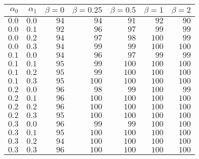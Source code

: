 \begin{tabular}{rr|rrrrr}
\hline\hline
 $\alpha_0$ & $\alpha_1$ & $\beta=0$ & $\beta=0.25$ & $\beta=0.5$ & $\beta=1$ & $\beta=2$ \\ 
 \hline
$0.0$ & $0.0$ & $94$ & $ 94$ & $ 91$ & $ 92$ & $ 90$\\ 
$0.0$ & $0.1$ & $92$ & $ 96$ & $ 97$ & $ 99$ & $ 99$\\ 
$0.0$ & $0.2$ & $94$ & $ 97$ & $ 98$ & $100$ & $ 99$\\ 
$0.0$ & $0.3$ & $94$ & $ 99$ & $ 99$ & $100$ & $100$\\ 
$0.1$ & $0.0$ & $94$ & $ 96$ & $ 97$ & $ 99$ & $ 99$\\ 
$0.1$ & $0.1$ & $95$ & $ 99$ & $100$ & $100$ & $100$\\ 
$0.1$ & $0.2$ & $95$ & $ 99$ & $100$ & $100$ & $100$\\ 
$0.1$ & $0.3$ & $95$ & $100$ & $100$ & $100$ & $100$\\ 
$0.2$ & $0.0$ & $96$ & $ 98$ & $ 99$ & $100$ & $ 99$\\ 
$0.2$ & $0.1$ & $96$ & $100$ & $100$ & $100$ & $100$\\ 
$0.2$ & $0.2$ & $96$ & $100$ & $100$ & $100$ & $100$\\ 
$0.2$ & $0.3$ & $95$ & $100$ & $100$ & $100$ & $100$\\ 
$0.3$ & $0.0$ & $96$ & $ 99$ & $ 99$ & $100$ & $100$\\ 
$0.3$ & $0.1$ & $95$ & $100$ & $100$ & $100$ & $100$\\ 
$0.3$ & $0.2$ & $94$ & $100$ & $100$ & $100$ & $100$\\ 
$0.3$ & $0.3$ & $96$ & $100$ & $100$ & $100$ & $100$\\ 
 \hline 
 \end{tabular}